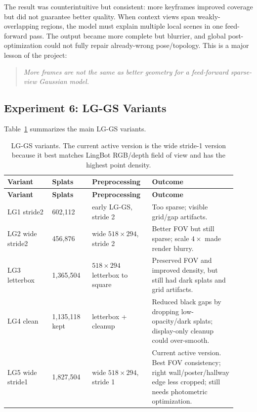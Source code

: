 \documentclass[11pt]{article}
\newcommand{\methodabbr}{LG-GS}
\newcommand{\RouteB}{\methodabbr\xspace}
\begin{document}
The result was counterintuitive but consistent: more keyframes improved coverage but did not guarantee better quality. When context views span weakly-overlapping regions, the model must explain multiple local scenes in one feed-forward pass. The output became more complete but blurrier, and global post-optimization could not fully repair already-wrong pose/topology. This is a major lesson of the project:

\begin{quote}
\emph{More frames are not the same as better geometry for a feed-forward sparse-view Gaussian model.}
\end{quote}

\subsection{Experiment 6: \RouteB Variants}

Table~\ref{tab:routeb} summarizes the main \RouteB variants.

\begin{longtable}{@{}p{0.18\linewidth}p{0.16\linewidth}p{0.24\linewidth}p{0.34\linewidth}@{}}
\caption{\RouteB variants. The current active version is the wide stride-1 version because it best matches LingBot RGB/depth field of view and has the highest point density.}
\label{tab:routeb}\\
\toprule
\textbf{Variant} & \textbf{Splats} & \textbf{Preprocessing} & \textbf{Outcome} \\
\midrule
\endfirsthead
\toprule
\textbf{Variant} & \textbf{Splats} & \textbf{Preprocessing} & \textbf{Outcome} \\
\midrule
\endhead
LG1 stride2 & 602,112 & early \RouteB, stride 2 & Too sparse; visible grid/gap artifacts. \\
\addlinespace
LG2 wide stride2 & 456,876 & wide \(518 \times 294\), stride 2 & Better FOV but still sparse; scale \(4\times\) made render blurry. \\
\addlinespace
LG3 letterbox & 1,365,504 & \(518 \times 294\) letterbox to square & Preserved FOV and improved density, but still had dark splats and grid artifacts. \\
\addlinespace
LG4 clean & 1,135,118 kept & letterbox + cleanup & Reduced black gaps by dropping low-opacity/dark splats; display-only cleanup could over-smooth. \\
\addlinespace
LG5 wide stride1 & 1,827,504 & wide \(518 \times 294\), stride 1 & Current active version. Best FOV consistency; right wall/poster/hallway edge less cropped; still needs photometric optimization. \\
\bottomrule
\end{longtable}
\end{document}
